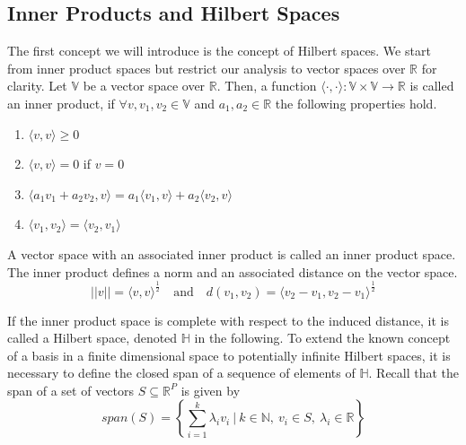 \documentclass[11pt,twoside,a4paper]{article}
\begin{document}
	\subsection{Inner Products and Hilbert Spaces}
	The first concept we will introduce is the concept of Hilbert spaces. We start from inner product spaces but restrict our analysis to vector spaces over $\mathbb{R}$ for clarity. Let $\mathbb{V}$ be a vector space over $\mathbb{R}$.  Then, a function $\langle \cdot, \cdot \rangle : \mathbb{V} \times  \mathbb{V} \rightarrow \mathbb{R}$ is called an inner product, if $\forall v, v_1, v_2 \in \mathbb{V}$ and $a_1, a_2 \in \mathbb{R}$ the following properties hold.
	
	\begin{multicols}{2}
		\begin{enumerate}
			\item $\langle v, v \rangle \geq 0$
			\item $\langle v, v \rangle = 0$ if $v = 0$
			\item $\langle a_1 v_1 + a_2 v_2, v \rangle = a_1 \langle v_1, v \rangle + a_2 \langle v_2, v \rangle$
			\item $\langle v_1, v_2 \rangle = \langle v_2, v_1 \rangle$
		\end{enumerate}
	\end{multicols}

	A vector space with an associated inner product is called an inner product space. The inner product defines a norm and an associated distance on the vector space.
	\begin{equation}
		\lvert \lvert v \rvert \rvert = {\langle v, v \rangle}^{\frac{1}{2}} \quad \text{and} \quad 
		d(v_1, v_2) = {\langle v_2 - v_1, v_2 - v_1 \rangle}^{\frac{1}{2}}
	\end{equation}
	
	If the inner product space is complete with respect to the induced distance, it is called a Hilbert space, denoted $\mathbb{H}$ in the following. To extend the known concept of a basis in a finite dimensional space to potentially infinite Hilbert spaces, it is necessary to define the closed span of a sequence of elements of $\mathbb{H}$. Recall that the span of a set of vectors $S \subseteq \mathbb{R}^P$ is given by
	\begin{equation}
		span(S) = \left\{\sum_{i = 1}^{k} \lambda_i v_i \: \bigg\vert \: k \in \mathbb{N}, \: v_i \in S, \: \lambda_i \in \mathbb{R} \right\}
	\end{equation}
			
\end{document}
